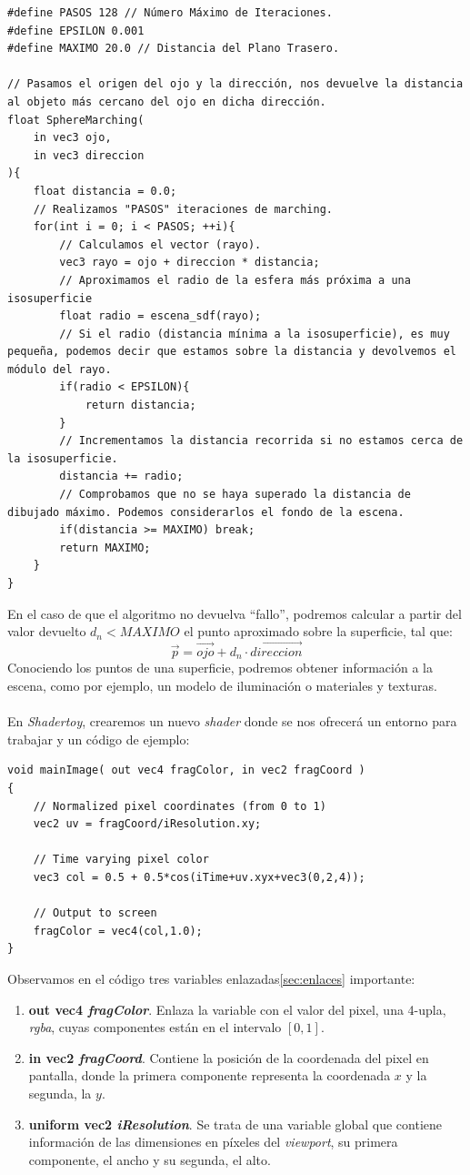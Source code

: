 \newpage
\begin{lstlisting}
#define PASOS 128 // Número Máximo de Iteraciones.
#define EPSILON 0.001
#define MAXIMO 20.0 // Distancia del Plano Trasero.

// Pasamos el origen del ojo y la dirección, nos devuelve la distancia al objeto más cercano del ojo en dicha dirección.
float SphereMarching(
    in vec3 ojo, 
    in vec3 direccion
){
    float distancia = 0.0;
    // Realizamos "PASOS" iteraciones de marching.
    for(int i = 0; i < PASOS; ++i){
        // Calculamos el vector (rayo).
        vec3 rayo = ojo + direccion * distancia;
        // Aproximamos el radio de la esfera más próxima a una isosuperficie
        float radio = escena_sdf(rayo);
        // Si el radio (distancia mínima a la isosuperficie), es muy pequeña, podemos decir que estamos sobre la distancia y devolvemos el módulo del rayo.
        if(radio < EPSILON){
            return distancia;
        }
        // Incrementamos la distancia recorrida si no estamos cerca de la isosuperficie.
        distancia += radio;
        // Comprobamos que no se haya superado la distancia de dibujado máximo. Podemos considerarlos el fondo de la escena.
        if(distancia >= MAXIMO) break;
        return MAXIMO;
    }
}
\end{lstlisting}
\newpage
En el caso  de que el algoritmo no devuelva \enquote{fallo}, podremos calcular a partir del valor devuelto \(d_n<MAXIMO\) el punto aproximado sobre la superficie, tal que:
\[ \Vec{p} = \Vec{ojo} + d_n \cdot  \Vec{direccion} \]
Conociendo los puntos de una superficie, podremos obtener información a la escena, como por ejemplo, un modelo de iluminación o materiales y texturas.\\\\
En \textit{Shadertoy}, crearemos un nuevo \textit{shader} donde se nos ofrecerá un entorno para trabajar y un código de ejemplo:
\begin{lstlisting}
void mainImage( out vec4 fragColor, in vec2 fragCoord )
{
    // Normalized pixel coordinates (from 0 to 1)
    vec2 uv = fragCoord/iResolution.xy;

    // Time varying pixel color
    vec3 col = 0.5 + 0.5*cos(iTime+uv.xyx+vec3(0,2,4));

    // Output to screen
    fragColor = vec4(col,1.0);
}
\end{lstlisting}
Observamos en el código tres variables enlazadas\ref{sec:enlaces} importante:
\begin{enumerate}
    \item \textbf{out vec4 \textit{fragColor}}. Enlaza la variable con el valor del pixel, una 4-upla, \textit{rgba}, cuyas componentes están en el intervalo \([0,1]\).
    \item \textbf{in vec2 \textit{fragCoord}}. Contiene la posición de la coordenada del pixel en pantalla, donde la primera componente representa la coordenada \(x\) y la segunda, la \(y\).
    \item \textbf{uniform vec2 \textit{iResolution}}. Se trata de una variable global que contiene información de las dimensiones en píxeles del \textit{viewport}, su primera componente, el ancho y su segunda, el alto.
\end{enumerate}
